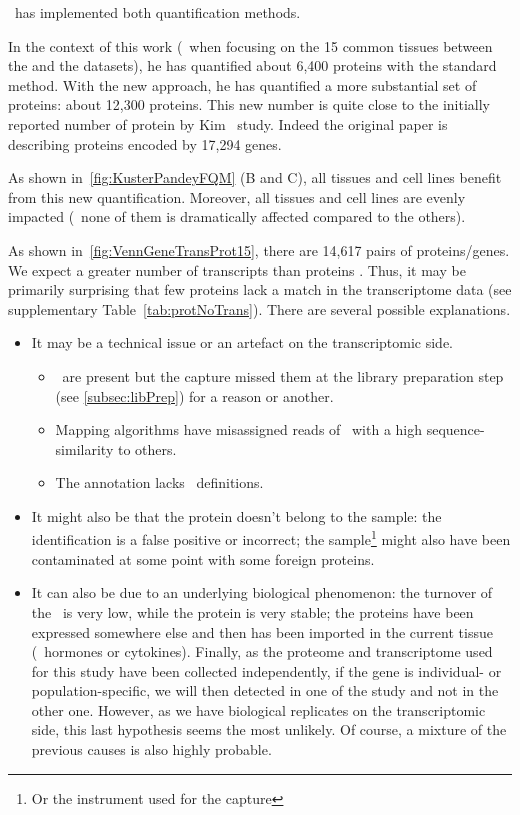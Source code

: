 \james\ has implemented both quantification methods.

In the context of this work (\ie\ when focusing on the 15 common tissues between
the  and the  datasets),
he has quantified about 6,400 proteins with
the standard method. With the new approach, he has quantified a more substantial set of
proteins: about 12,300 proteins. This new number is quite close to the initially
reported number of protein by Kim \etal\ study.
Indeed the original paper is describing proteins encoded by 17,294 genes.

As shown in~\cref{fig:KusterPandeyFQM} (B and C),
all tissues and cell lines benefit from this new quantification.
Moreover, all tissues and cell lines are evenly impacted
(\ie\ none of them is dramatically affected compared to the others).

As shown in~\cref{fig:VennGeneTransProt15}, there are 14,617 pairs of
proteins/genes.
We expect a greater number of transcripts than proteins .
Thus, it may be primarily surprising that
few proteins lack a match in the transcriptome data
(see supplementary Table~\cref{tab:protNoTrans}).
There are several possible explanations.
\begin{itemize}[topsep=0pt,nosep]
\item It may be a technical issue or an artefact on the transcriptomic side.
    \begin{itemize}[topsep=0pt,nosep]
        \item \mRNAs\ are present but the capture missed them at the library preparation
        step (see \cref{subsec:libPrep}) for a reason or another.
        \item Mapping algorithms have misassigned reads of
        \mRNAs\ with a high sequence-similarity to others.
        \item The annotation lacks \mRNAs\ definitions.
    \end{itemize}
\item It might also be that the protein doesn't belong to the sample: the identification
is a false positive or incorrect; the sample\footnote{Or the instrument used for
the capture} might also have been contaminated at some point with some foreign
proteins.
\item It can also be due to an underlying biological phenomenon:
the turnover of the \mRNA\ is very low, while the protein is very stable;
the proteins have been expressed somewhere else and then has been imported in the
current tissue (\eg\ hormones or cytokines). Finally, as the proteome
and transcriptome used for this study have been collected independently, if the
gene is individual- or population-specific, we will then detected in one of the
study and not in the other one. However, as we have biological replicates on the
transcriptomic side, this last hypothesis seems the most unlikely.
Of course, a mixture of the previous causes is also highly probable.
\end{itemize}

